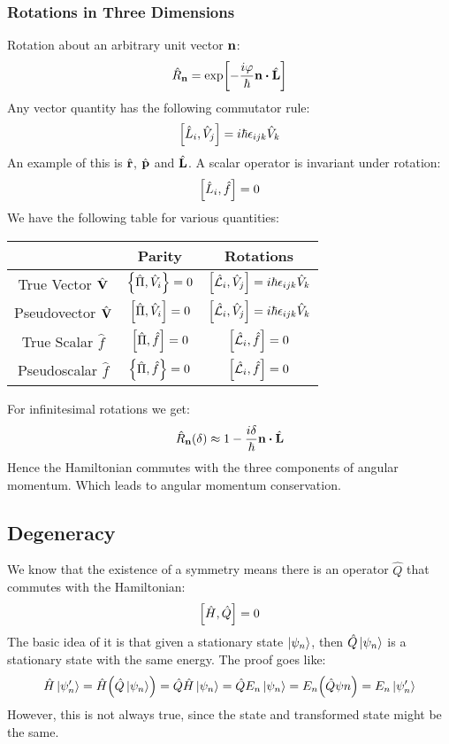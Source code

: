 \subsubsection{Rotations in Three Dimensions}
Rotation about an arbitrary unit vector $\vb{n}$:
\begin{align*}
  \hat{R}_{\vb{n}}=\mathrm{exp}\qty[-\dfrac{i\varphi}{\hbar}\vb{n}\vdot\hat{\vb{L}}]
\end{align*}
Any vector quantity has the following commutator rule:
\begin{align*}
  \comm{\hat{L}_i}{\hat{V}_j}=i\hbar\epsilon_{ijk}\hat{V}_k
\end{align*}
An example of this is $\hat{\vb{r}}$, $ \hat{\vb{p}}$ and $\hat{\vb{L}}$. A scalar operator is invariant under rotation:
\begin{align*}
  \comm{\hat{L}_i}{\hat{f}}=0
\end{align*}
We have the following table for various quantities:
\begin{table}[H]
\centering
\begin{tabular}{ccc}
\hline
 & Parity & Rotations \\ \hline
True Vector $\hat{\vb{V}}$ & $\acomm{\hat{\Pi}}{\hat{V}_i}=0$ & $\comm{\hat{\L}_i}{\hat{V}_j}=i\hbar\epsilon_{ijk}\hat{V}_k$ \\
Pseudovector $\hat{\vb{V}}$ & $\comm{\hat{\Pi}}{\hat{V}_i}=0$ & $\comm{\hat{\L}_i}{\hat{V}_j}=i\hbar\epsilon_{ijk}\hat{V}_k$ \\
True Scalar $\hat{f}$ & $\comm{\hat{\Pi}}{\hat{f}}=0$ & $\comm{\hat{\L}_i}{\hat{f}}=0$ \\
Pseudoscalar $\hat{f}$ & $\acomm{\hat{\Pi}}{\hat{f}}=0$ & $\comm{\hat{\L}_i}{\hat{f}}=0$ \\ \hline
\end{tabular}
\end{table}
For infinitesimal rotations we get:
\begin{align*}
  \hat{R}_{\vb{n}}(\delta)\approx 1-\dfrac{i\delta}{\hbar}\vb{n}\vdot\hat{\vb{L}}
\end{align*}
Hence the Hamiltonian commutes with the three components of angular momentum. Which leads to angular momentum conservation. 
\subsection{Degeneracy}
We know that the existence of a symmetry means there is an operator $\hat{Q}$ that commutes with the Hamiltonian:
\begin{align*}
  \comm{\hat{H}}{\hat{Q}}=0
\end{align*}
The basic idea of it is that given a stationary state $\ket{\psi_n}$, then $\hat{Q}\ket{\psi_n}$ is a stationary state with the same energy. The proof goes like:
\begin{align*}
  \hat{H}\ket{\psi_n'}=\hat{H}\qty(\hat{Q}\ket{\psi_n})=
  \hat{Q}\hat{H}\ket{\psi_n}=\hat{Q}E_n\ket{\psi_n}=E_n\qty(\hat{Q}\psi{n})=
  E_n\ket{\psi_n'}
\end{align*}
However, this is not always true, since the state and transformed state might be the same. 
